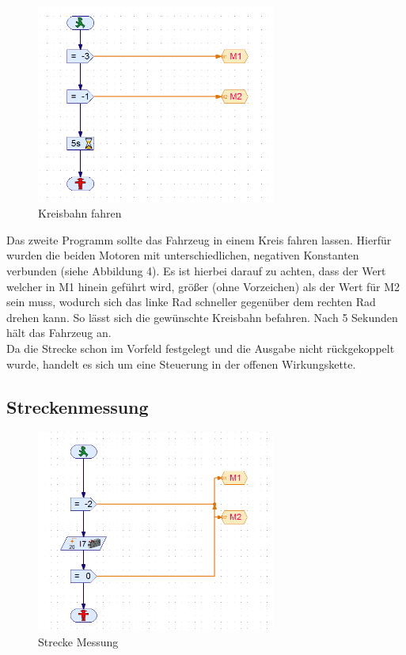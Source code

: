 \documentclass[a4paper, 12pt]{article}
\begin{document}
\begin{figure}[H]
  \centering
  \includegraphics[width=0.7\textwidth]{images/abb_52b.PNG}
  \caption{Kreisbahn fahren}
  \label{fig:KB fahren}
  \end{figure}
  

Das zweite Programm sollte das Fahrzeug in einem Kreis fahren lassen. Hierfür wurden die beiden Motoren mit unterschiedlichen, negativen Konstanten verbunden (siehe Abbildung 4). Es ist hierbei darauf zu achten, dass der Wert welcher in M1 hinein geführt wird, größer (ohne Vorzeichen) als der Wert für M2 sein muss, wodurch sich das linke Rad schneller gegenüber dem rechten Rad drehen kann. So lässt sich die gewünschte Kreisbahn befahren. Nach 5 Sekunden hält das Fahrzeug an.
\\
Da die Strecke schon im Vorfeld festgelegt und die Ausgabe nicht rückgekoppelt wurde, handelt es sich um eine Steuerung in der offenen Wirkungskette. 



\pagebreak 

\subsection*{Streckenmessung}

\begin{figure}[H]
\centering
\includegraphics[width=0.7\textwidth]{images/abb_53.PNG}
\caption{Strecke Messung}
\label{fig:}
\end{figure}
\end{document}
